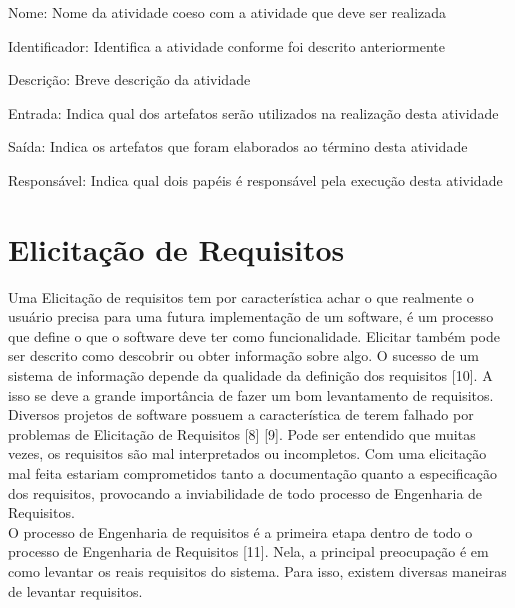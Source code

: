 {{	\onecolumn
		\begin{usecase}

    		\addfield
    			{Nome:}
    			{
    				Nome da atividade coeso com a atividade que deve ser realizada
    			}

			\addfield
    			{Identificador:}
    			{
    				Identifica a atividade conforme foi descrito anteriormente
    			}

    		\addfield
    			{Descrição:}
    			{
    				Breve descrição da atividade
    			}
    	
    		\addfield
    			{Entrada:}
    			{
    				Indica qual dos artefatos serão utilizados na realização desta atividade
    			}

    		\addfield
    			{Saída:}
    			{
    				Indica os artefatos que foram elaborados ao término desta atividade
    			}

			\addfield
    			{Responsável:}
    			{
    				Indica qual dois papéis é responsável pela execução  desta atividade
    			}

		\end{usecase}
	\onecolumn

}



\section{Elicitação de Requisitos}
\label{sec:nova_sess_o}

\tab Uma Elicitação de requisitos tem por característica achar o que realmente o usuário precisa para uma futura implementação de um software, é um processo que define o que o software deve ter como funcionalidade. Elicitar também pode ser descrito como descobrir ou obter informação sobre algo. O sucesso de um sistema de informação depende da qualidade da definição dos requisitos [10]. A isso se deve a grande importância de fazer um bom levantamento de requisitos.\\
\tab Diversos projetos de software possuem a característica de terem falhado por problemas de Elicitação de Requisitos [8] [9]. Pode ser entendido que muitas vezes, os requisitos são mal interpretados ou incompletos. Com uma elicitação mal feita estariam comprometidos tanto a documentação quanto a especificação dos requisitos, provocando a inviabilidade de todo processo de Engenharia de Requisitos.\\
\tab O processo de Engenharia de requisitos é a primeira etapa dentro de todo o processo de Engenharia de Requisitos [11]. Nela, a principal preocupação é em como levantar os reais requisitos do sistema. Para isso, existem diversas maneiras de levantar requisitos. \\

}
